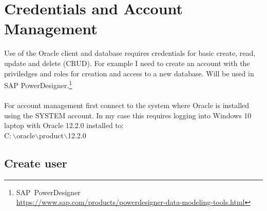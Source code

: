 
\newpage
\section{Credentials and Account Management}
Use of the Oracle client and database requires credentials
for basic create, read, update and delete (CRUD). For example
I need to create an account with the priviledges and roles for
creation and access to a new database.  Will be used in
SAP PowerDesigner.\footnote{SAP\ PowerDesigner\\
  \href{https://www.sap.com/products/powerdesigner-data-modeling-tools.html}{https://www.sap.com/products/powerdesigner-data-modeling-tools.html}}\\
\\
For account management first connect to the system where Oracle is
installed using the SYSTEM account.  In my case this requires logging
into Windows 10 laptop with Oracle 12.2.0 installed to:\\
C$\colon\backslash$oracle$\backslash$product$\backslash$12.2.0

\subsection{Create user}
